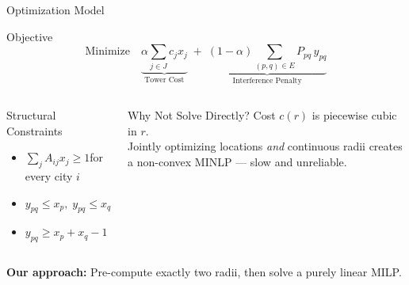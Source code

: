 \begin{frame}[t]{Optimization Model}{}
    
    \begin{center}
    \begin{minipage}{0.82\textwidth} %
        \begin{block}{Objective}
            \begin{equation*}
                \text{Minimize} \quad
                \underbrace{\alpha \sum_{j \in J} c_j x_j}_{\text{Tower Cost}} \;+\;
                \underbrace{(1-\alpha) \sum_{(p,q) \in E} P_{pq} \, y_{pq}}_{\text{Interference Penalty}}
            \end{equation*}
        \end{block}
    \end{minipage}
    \end{center}

    \vspace{0.15cm}
    \begin{columns}[T]
        \begin{block}{Structural Constraints}
            \begin{itemize}
                \item $\sum_{j} A_{ij} x_j \ge 1$\quad for every city $i$
                \item $y_{pq} \le x_p,\; y_{pq} \le x_q$
                \item $y_{pq} \ge x_p + x_q - 1$
            \end{itemize}
        \end{block}

        \begin{alertblock}{Why Not Solve Directly?}
            Cost $c(r)$ is \alert{piecewise cubic} in $r$.\\
            Jointly optimizing locations \emph{and} continuous radii creates a non-convex MINLP — slow and unreliable.
        \end{alertblock}
    \end{columns}

    \vspace{0.1cm}
    \begin{center}
        \small\textbf{Our approach:} Pre-compute exactly two radii, then solve a purely linear MILP.
    \end{center}
\end{frame}
